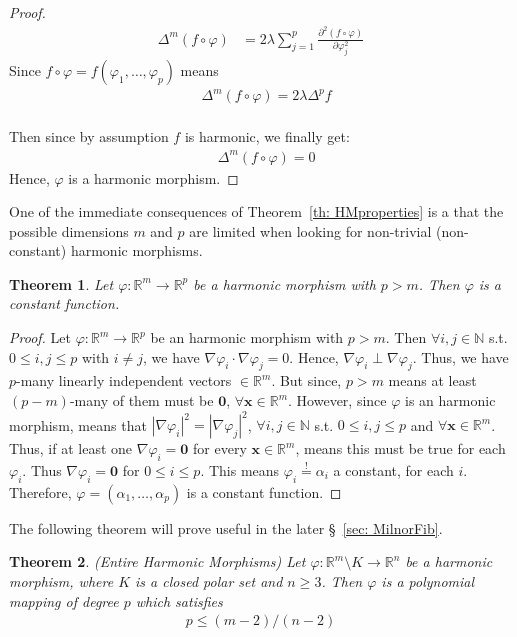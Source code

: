 \documentclass[12pt]{article}
\newtheorem{theorem}{Theorem}[section]
\theoremstyle{definition}
\numberwithin{equation}{subsection}
\begin{document}
\begin{proof}
\begin{align*}
\Delta^m(f\circ\varphi) &= 2\lambda \sum_{j=1}^p \frac{\partial^2  \left( f \circ \varphi\right)}{\partial \varphi_j^2} 
\end{align*}
Since $f\circ \varphi = f(\varphi_1, \dots, \varphi_p)$ means
\begin{align*}
& \Delta^m(f\circ\varphi) = 2\lambda \Delta^p f \\
\end{align*}

Then since by assumption $f$ is harmonic, we finally get: 
\begin{align*}
& \Delta^m(f\circ\varphi) = 0 
\end{align*}
Hence, $\varphi$ is a harmonic morphism.

\end{proof}

One of the immediate consequences of Theorem~\ref{th: HMproperties} is a that the possible dimensions $m$ and $p$ are limited when looking for non-trivial (non-constant) harmonic morphisms.\\
\begin{theorem}
Let $\varphi: \mathbb{R}^m \rightarrow \mathbb{R}^p$ be a harmonic morphism with $p > m$. Then $\varphi$ is a constant function.
\end{theorem}

\begin{proof}
Let $\varphi: \mathbb{R}^m \rightarrow \mathbb{R}^p$ be an harmonic morphism with $p > m$. Then $\forall i, j \in \mathbb{N}$ s.t. $0\leq i,j \leq p$ with $i \neq j$, we have $\nabla \varphi_i \cdot \nabla \varphi_j = 0$. Hence, $\nabla \varphi_i \perp \nabla \varphi_j$. Thus, we have $p$-many linearly independent vectors $\in \mathbb{R}^m$. But since, $p > m$ means at least $(p-m)$-many of them must be $\mathbf{0}$, $\forall \mathbf{x} \in \mathbb{R}^m$. However, since $\varphi$ is an harmonic morphism, means that $|\nabla \varphi_i|^2 = |\nabla \varphi_j|^2$, $\forall i,j \in \mathbb{N}$ s.t. $0 \leq i,j \leq p$ and $\forall \mathbf{x} \in \mathbb{R}^m$. Thus, if at least one $\nabla \varphi_i = \mathbf{0}$  for every  $\mathbf{x} \in \mathbb{R}^m$, means this must be true for each  $\varphi_i$. Thus $\nabla \varphi_i = \mathbf{0}$ for $ 0 \leq i \leq p$. This means  $\varphi_i \overset{!}{=} \alpha_i$ a constant, for each $i$. Therefore,  $\varphi = \left( \alpha_1, \ldots, \alpha_p \right)$ is a constant function.
\end{proof}

\vspace{1cm}
The following theorem will prove useful in the later \S~\ref{sec: MilnorFib}.
\begin{theorem}
(Entire Harmonic Morphisms) Let $\varphi: \mathbb{R}^m \setminus K \rightarrow \mathbb{R}^n$ be a harmonic morphism, where $K$ is a closed polar set and $n \geq 3$. Then $\varphi$ is a polynomial mapping of degree $p$ which satisfies
\begin{align}\label{eq:25}
    p \leq (m-2)/ (n-2)
\end{align}
\end{theorem}
\end{document}
